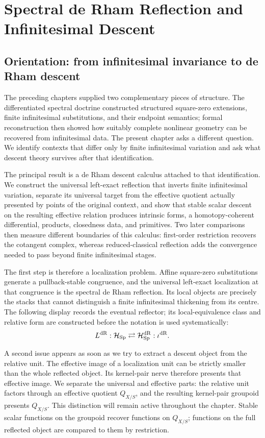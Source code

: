 \chapter{Spectral de Rham Reflection and Infinitesimal Descent}
\label{chap:spectral-de-Rham}

\section{Orientation: from infinitesimal invariance to de Rham descent}
\label{sec:de-Rham-purpose}

The preceding chapters supplied two complementary pieces of structure. The
differentiated spectral doctrine constructed structured square-zero extensions,
finite infinitesimal substitutions, and their endpoint semantics; formal
reconstruction then showed how suitably complete nonlinear geometry can be
recovered from infinitesimal data. The present chapter asks a different
question. We identify contexts that differ only by finite infinitesimal
variation and ask what descent theory survives after that identification.

The principal result is a de Rham descent calculus attached to that
identification. We construct the universal left-exact reflection that inverts
finite infinitesimal variation, separate its universal target from the effective
quotient actually presented by points of the original context, and show that
stable scalar descent on the resulting effective relation produces intrinsic
forms, a homotopy-coherent differential, products, closedness data, and
primitives. Two later comparisons then measure different boundaries of this
calculus: first-order restriction recovers the cotangent complex, whereas
reduced-classical reflection adds the convergence needed to pass beyond finite
infinitesimal stages.

The first step is therefore a localization problem. Affine square-zero
substitutions generate a pullback-stable congruence, and the universal
left-exact localization at that congruence is the spectral de Rham reflection.
Its local objects are precisely the stacks that cannot distinguish a finite
infinitesimal thickening from its centre. The following display records the
eventual reflector; its local-equivalence class and relative form are constructed
before the notation is used systematically:
\[
  L^{\mathrm{dR}}:
  \mathcal H_{\operatorname{Sp}}
  \rightleftarrows
  \mathcal H_{\operatorname{Sp}}^{\mathrm{dR}}:
  \iota^{\mathrm{dR}}.
\]

A second issue appears as soon as we try to extract a descent object from the
relative unit. The effective image of a localization unit can be strictly
smaller than the whole reflected object. Its kernel-pair nerve therefore
presents that effective image. We separate the universal and effective parts:
the relative unit factors through an effective quotient \(Q_{X/S}\), and the
resulting kernel-pair groupoid presents \(Q_{X/S}\). This distinction will remain active
throughout the chapter. Stable scalar functions on the groupoid recover
functions on \(Q_{X/S}\); functions on the full reflected object are compared
to them by restriction.

